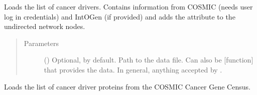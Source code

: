 \documentclass[letterpaper,10pt,english]{sphinxmanual}
\begin{document}
\begin{fulllineitems}
\begin{fulllineitems}
\begin{description}
\end{description}

\end{fulllineitems}


\begin{fulllineitems}
\label{\detokenize{main:pypath.main.PyPath.basic_stats_intergroup}}
\end{fulllineitems}


\begin{fulllineitems}
\label{\detokenize{main:pypath.main.PyPath.cancer_drivers_list}}
Loads the list of cancer drivers. Contains information from
COSMIC (needs user log in credentials) and IntOGen (if provided)
and adds the attribute to the undirected network nodes.
\begin{quote}\begin{description}
\item[{Parameters}] \leavevmode
{} () \textendash{} Optional,  by default. Path to the data file. Can
also be {[}function{]} that provides the data. In general,
anything accepted by
.

\end{description}\end{quote}

\end{fulllineitems}


\begin{fulllineitems}
\label{\detokenize{main:pypath.main.PyPath.cancer_gene_census_list}}
Loads the list of cancer driver proteins from the COSMIC Cancer
Gene Census.

\end{fulllineitems}



\end{fulllineitems}
\end{document}
